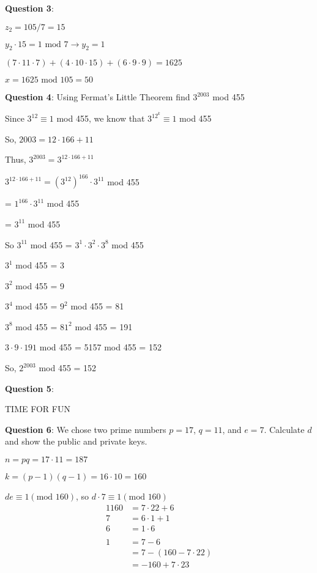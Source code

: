 \documentclass{article} %
\newcommand{\question}[2][]{\begin{flushleft}
        \textbf{Question #1}: #2

\end{flushleft}}
\begin{document}
    \newpage

    \question[3]{}

    $z_2 = 105 / 7 = 15$

    $y_2 \cdot 15 = 1 \text{ mod } 7 \rightarrow y_2 = 1$ 

    $(7 \cdot 11 \cdot 7) + (4 \cdot 10 \cdot 15) + (6 \cdot 9 \cdot 9) = 1625$

    $x = 1625 \text{ mod } 105 = 50$

    \question[4]{Using Fermat's Little Theorem find $3^{2003}$ mod 455}

    Since $3^{12} \equiv 1$ mod 455, we know that $3^{12^k} \equiv 1$ mod 455

    So, $2003 = 12 \cdot 166 + 11$

    Thus, $3^{2003} = 3^{12 \cdot 166 + 11}$

    $3^{12 \cdot 166 + 11} = (3^{12})^{166} \cdot 3^{11}$ mod 455

    \tabto{2.1cm} = $1^{166} \cdot 3^{11}$ mod 455

    \tabto{2.1cm} = $3^{11}$ mod 455 
    
    So $3^{11}$ mod 455 = $3^1 \cdot 3^2 \cdot 3^8$ mod 455

    $3^1$ mod 455 = 3
    
    $3^2$ mod 455 = 9

    $3^4$ mod 455 = $9^2$ mod 455 = 81

    $3^8$ mod 455 = $81^2$ mod 455 = 191

    $3 \cdot 9 \cdot 191$ mod 455 = 5157 mod 455 = 152

    So, $2^{2003}$ mod 455 = 152

    \question[5]{}

    TIME FOR FUN

    \question[6]{We chose two prime numbers $p = 17$, $q = 11$, and $e = 7$. Calculate $d$ and show the 
    public and private keys.}

    $n = pq = 17 \cdot 11 = 187$
    
    $k = (p-1)(q-1) = 16 \cdot 10 = 160$

    $de \equiv 1 (\text{mod } 160)$, so $d \cdot 7 \equiv 1 (\text{mod } 160)$
    \begin{alignat*}{1}
        160 &= 7 \cdot 22 + 6\\
        7 &= 6 \cdot 1 + 1\\
        6 &= 1 \cdot 6\\
        \\
        1 &= 7 - 6\\
        &= 7 - (160 - 7 \cdot 22)\\
        &= -160 + 7 \cdot 23\\
    \end{alignat*}
\end{document}
